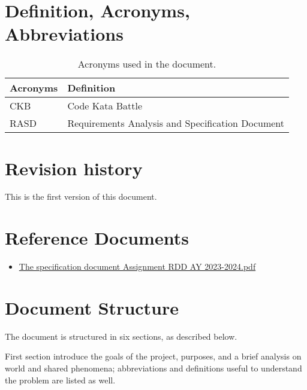 \section{Definition, Acronyms, Abbreviations}
\label{sec:definition_acronyms_abbreviations}%
\begin{table}[H]
    \begin{center}
        \begin{tabular}{ |l|l| }
            \hline
            \textbf{Acronyms} & \textbf{Definition}                              \\
            \hline
            CKB              & Code Kata Battle                      \\
            \hline
            RASD              & Requirements Analysis and Specification Document \\
            \hline
        \end{tabular}
        \caption{Acronyms used in the document.}
        \label{tab:acronyms}%
    \end{center}
\end{table}


\section{Revision history}
\label{sec:revision_history}%
This is the first version of this document.


\section{Reference Documents}
\label{sec:reference_documents}%
\begin{itemize}
    \item \href{https://polimi365-my.sharepoint.com/:b:/g/personal/10710351_polimi_it/EZXUPFfeFKdBkf5M8W-EBYgB2JrrVLr23BYJ4MXQ7kzUkA?e=o0wvyw}{The specification document Assignment RDD AY 2023-2024.pdf}
\end{itemize}


\section{Document Structure}
\label{sec:document_structure}%
The document is structured in six sections, as described below.

First section introduce the goals of the project, purposes, and a brief analysis on world and shared phenomena;
abbreviations and definitions useful to understand the problem are listed as well.

